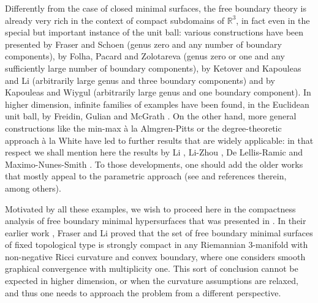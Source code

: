 \documentclass[JEP,XML,SOM,Unicode]{cedram}
\newcounter{cas}
\theoremstyle{definition}
\newcommand{\R}{\mathbb{R}}
\begin{document}
Differently from the case of closed minimal surfaces, the free boundary theory is already very rich in the context of compact subdomains of $\R^3$, in fact even in the special but important instance of the unit ball: various constructions have been presented by Fraser and Schoen \cite{FS16} (genus zero and any number of boundary components), by Folha, Pacard and Zolotareva \cite{FPZ15} (genus zero or one and any sufficiently large number of boundary components), by Ketover \cite{Ket16A} and Kapouleas and Li \cite{KL17} (arbitrarily large genus and three boundary components) and by Kapouleas and Wiygul \cite{KW17} (arbitrarily large genus and one boundary component). In higher dimension, infinite families of examples have been found, in the Euclidean unit ball, by Freidin, Gulian and McGrath \cite{FGM16}. On the other hand, more general constructions like the min-max à la Almgren-Pitts or the degree-theoretic approach à la White have led to further results that are widely applicable: in that respect we shall mention here the results by Li \cite{Li15}, Li-Zhou \cite{LZ16B}, De Lellis-Ramic \cite{DR16} and Maximo-Nunes-Smith \cite{MNS13}. To those developments, one should add the older works that mostly appeal to the parametric approach (see \cite{Cou40, Cou50, Str84, GJ86A, Jo86, Jo86b, Jo87, Wan99, Fra00} and references therein, among others).

Motivated by all these examples, we wish to proceed here in the compactness analysis of free boundary minimal hypersurfaces that was presented in \cite{ACS17}. In their earlier work \cite{FL14}, Fraser and Li proved that the set of free boundary minimal surfaces of fixed topological type is strongly compact in any Riemannian 3-manifold with non-negative Ricci curvature and convex boundary, where one considers smooth graphical convergence with multiplicity one. This sort of conclusion cannot be expected in higher dimension, or when the curvature assumptions are relaxed, and thus one needs to approach the problem from a different perspective. 
\end{document}
